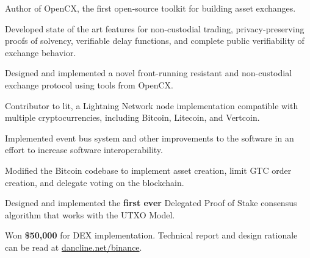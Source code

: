 
\begin{tightemize}
  \item Author of OpenCX, the first open-source toolkit for building asset exchanges.
  \item Developed state of the art features for non-custodial trading, privacy-preserving proofs of solvency, verifiable delay functions, and complete public verifiability of exchange behavior.
  \item Designed and implemented a novel front-running resistant and non-custodial exchange protocol using tools from OpenCX.
\end{tightemize}
\subsectionsep

\begin{tightemize}
  \item Contributor to lit, a Lightning Network node implementation compatible with multiple cryptocurrencies, including Bitcoin, Litecoin, and Vertcoin.
  \item Implemented event bus system and other improvements to the software in an effort to increase software interoperability.
\end{tightemize}
\subsectionsep

\begin{tightemize}
  \item Modified the Bitcoin codebase to implement asset creation, limit GTC
    order creation, and delegate voting on the blockchain.
  \item Designed and implemented the \textbf{first ever} Delegated Proof of
    Stake consensus algorithm that works with the UTXO Model.
  \item Won \textbf{\$50,000} for DEX implementation. Technical report and
    design rationale can be read at
    \href{http://dancline.net/binance/}{dancline.net/binance}.
\end{tightemize}
